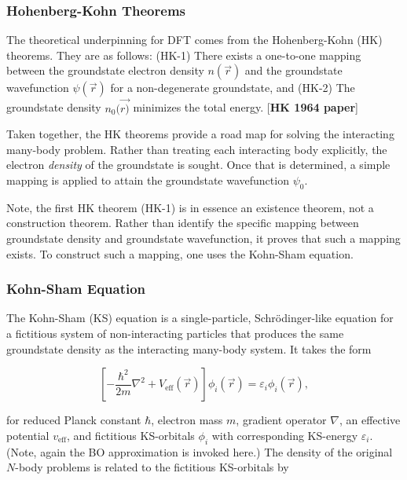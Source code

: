         \subsubsection{Hohenberg-Kohn Theorems} 
        
        The theoretical underpinning for DFT comes from the Hohenberg-Kohn (HK) theorems. They are as follows: (HK-1) There exists a one-to-one mapping between the groundstate electron density $n(\Vec{r})$ and the groundstate wavefunction $\psi (\Vec{r})$ for a non-degenerate groundstate, and (HK-2) The groundstate density $n_0(\Vec{r)}$ minimizes the total energy. [\textbf{HK 1964 paper}]
        
        Taken together, the HK theorems provide a road map for solving the interacting many-body problem. Rather than treating each interacting body explicitly, the electron \textit{density} of the groundstate is sought. Once that is determined, a simple mapping is applied to attain the groundstate wavefunction $\psi_0$.
        
        Note, the first HK theorem (HK-1) is in essence an existence theorem, not a construction theorem. Rather than identify the specific mapping between groundstate density and groundstate wavefunction, it proves that such a mapping exists. To construct such a mapping, one uses the Kohn-Sham equation.
        
        \subsubsection{Kohn-Sham Equation} 
        
        The Kohn-Sham (KS) equation is a single-particle, Schrödinger-like equation for a fictitious system of non-interacting particles that produces the same groundstate density as the interacting many-body system. It takes the form
        
        \begin{equation}
            \label{eq:ks}
            \left[-\frac{\hbar^2}{2 m}\nabla^2 + V_\text{eff}(\Vec{r}) \right]\phi_i(\Vec{r}) = \varepsilon_i \phi_i(\Vec{r}),
        \end{equation}
        
        \noindent for reduced Planck constant $\hbar$, electron mass $m$, gradient operator $\nabla$, an effective potential $v_\text{eff}$, and fictitious KS-orbitals $\phi_i$ with corresponding KS-energy $\varepsilon_i$. (Note, again the BO approximation is invoked here.) The density of the original $N$-body problems is related to the fictitious KS-orbitals by
        
